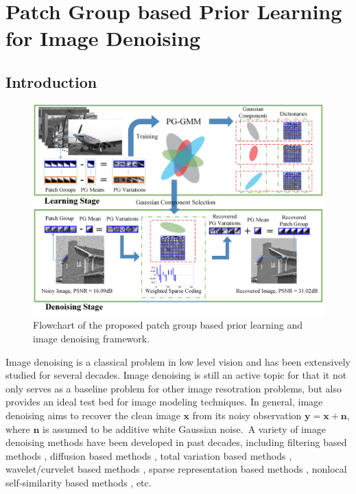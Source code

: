 %
\chapter{Patch Group based Prior Learning for Image Denoising}
\label{sec:external}


\section{Introduction}
\begin{figure}[t!]
\centering
\includegraphics[width=0.8\linewidth]{images/pgpd/flowchart2.png}
\vspace{-3mm}
\caption{Flowchart of the proposed patch group based prior learning and image denoising framework.}
\label{fig2-1}
\end{figure}

Image denoising is a classical problem in low level vision and has been extensively studied for several decades. Image denoising is still an active topic for that it not only serves as a baseline problem for other image resotration problems, but also provides an ideal test bed for image modeling techniques. In general, image denoising aims to recover the clean image $\bm{x}$ from its noisy observation $\bm{y} = \bm{x} + \bm{n}$, where $\bm{n}$ is assumed to be additive white Gaussian noise.\ A variety of image denoising methods have been developed in past decades, including filtering based methods \cite{Tomasi1998}, diffusion based methods \cite{PeronaMalik1990}, total variation based methods \cite{rudin1992nonlinear,osher2005iterative}, wavelet/curvelet based methods \cite{softthresholding,bayesshrink,curvelet}, sparse representation based methods \cite{ksvd,lssc,ncsr}, nonlocal self-similarity based methods \cite{nlm,bm3d,nnm,wnnm}, etc.

